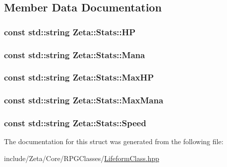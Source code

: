 \subsection{Member Data Documentation}
\hypertarget{structZeta_1_1Stats_aa5922fb31d2790f7779ad2e7e4d464ce}{
\subsubsection[{H\+P}]{\setlength{\rightskip}{0pt plus 5cm}const std\+::string Zeta\+::\+Stats\+::\+H\+P\hspace{0.3cm}{\ttfamily [static]}}}\label{structZeta_1_1Stats_aa5922fb31d2790f7779ad2e7e4d464ce}
\hypertarget{structZeta_1_1Stats_a66d2fd47b970cc2381f931f7752d8812}{
\subsubsection[{Mana}]{\setlength{\rightskip}{0pt plus 5cm}const std\+::string Zeta\+::\+Stats\+::\+Mana\hspace{0.3cm}{\ttfamily [static]}}}\label{structZeta_1_1Stats_a66d2fd47b970cc2381f931f7752d8812}
\hypertarget{structZeta_1_1Stats_aee195a6f113d82bd5e561fcc69abb44c}{
\subsubsection[{Max\+H\+P}]{\setlength{\rightskip}{0pt plus 5cm}const std\+::string Zeta\+::\+Stats\+::\+Max\+H\+P\hspace{0.3cm}{\ttfamily [static]}}}\label{structZeta_1_1Stats_aee195a6f113d82bd5e561fcc69abb44c}
\hypertarget{structZeta_1_1Stats_a4353689bc3919919c8052d834810813f}{
\subsubsection[{Max\+Mana}]{\setlength{\rightskip}{0pt plus 5cm}const std\+::string Zeta\+::\+Stats\+::\+Max\+Mana\hspace{0.3cm}{\ttfamily [static]}}}\label{structZeta_1_1Stats_a4353689bc3919919c8052d834810813f}
\hypertarget{structZeta_1_1Stats_af09b51db0fc0d7f5c223d4691a5f40fd}{
\subsubsection[{Speed}]{\setlength{\rightskip}{0pt plus 5cm}const std\+::string Zeta\+::\+Stats\+::\+Speed\hspace{0.3cm}{\ttfamily [static]}}}\label{structZeta_1_1Stats_af09b51db0fc0d7f5c223d4691a5f40fd}


The documentation for this struct was generated from the following file\+:\begin{DoxyCompactItemize}
\item 
include/\+Zeta/\+Core/\+R\+P\+G\+Classes/\hyperlink{LifeformClass_8hpp}{Lifeform\+Class.\+hpp}\end{DoxyCompactItemize}

